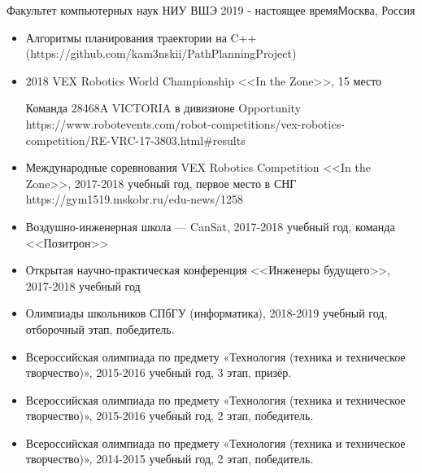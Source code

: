 \documentclass[10pt,a4paper]{altacv}
\begin{document}
\tagline{}

\begin{fullwidth}
\makecvheader
\end{fullwidth}


 {Факультет компьютерных наук НИУ ВШЭ }{2019 - настоящее время}{Москва, Россия} 
\textsc{}
\\
\textsc{}

\begin{itemize}
\item Алгоритмы планирования траектории на C++ (https://github.com/kam3nskii/PathPlanningProject)
\end{itemize}


\begin{itemize}
\item 2018 VEX Robotics World Championship <<In the Zone>>, 15 место


Команда 28468A VICTORIA в дивизионе Opportunity
https://www.robotevents.com/robot-competitions/vex-robotics-competition/RE-VRC-17-3803.html\#results


\item Международные соревнования VEX Robotics Competition <<In the Zone>>, 2017-2018 учебный год, первое место в СНГ
https://gym1519.mskobr.ru/edu-news/1258

\item Воздушно-инженерная школа — CanSat, 2017-2018 учебный год, команда <<Позитрон>>
\item Открытая научно-практическая конференция <<Инженеры будущего>>, 2017-2018 учебный год
\end{itemize}

\begin{itemize}
\item Олимпиады школьников СПбГУ (информатика), 2018-2019 учебный год, отборочный этап, победитель.
\item Всероссийская олимпиада по предмету «Технология (техника и техническое творчество)», 2015-2016 учебный год, 3 этап, призёр.
\item Всероссийская олимпиада по предмету «Технология (техника и техническое творчество)», 2015-2016 учебный год, 2 этап, победитель.
\item Всероссийская олимпиада по предмету «Технология (техника и техническое творчество)», 2014-2015 учебный год, 2 этап, победитель.

\end{itemize}

\clearpage
\end{document}
